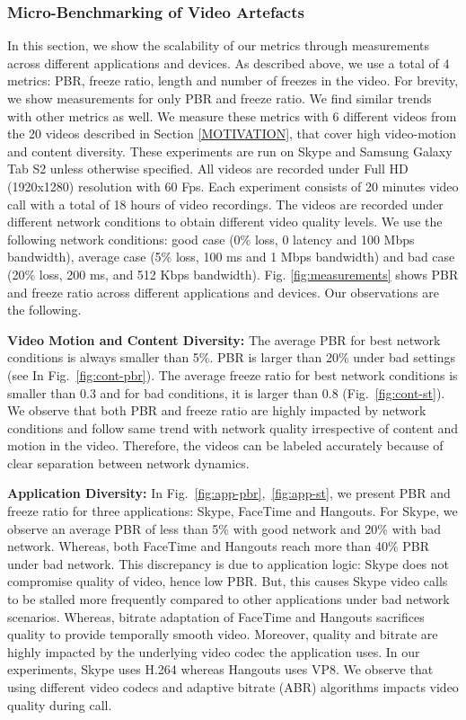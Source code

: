 \subsubsection{Micro-Benchmarking of Video Artefacts}
In this section, we show the scalability of our metrics through measurements across different applications and devices. As described above, we use a total of 4 metrics: PBR, freeze ratio, length and number of freezes in the video. For brevity, we show measurements for only PBR and freeze ratio. We find similar trends with other metrics as well. We measure these metrics with 6 different videos from the 20 videos described in Section \ref{MOTIVATION}, that cover high video-motion and content diversity. These experiments are run on Skype and Samsung Galaxy Tab S2 unless otherwise specified. All videos are recorded under Full HD (1920x1280) resolution with 60 Fps. Each experiment consists of 20 minutes video call with a total of 18 hours of video recordings. The videos are recorded under different network conditions to obtain different video quality  levels. We use the following network conditions: good case (0\% loss, 0 latency and 100 Mbps bandwidth), average case (5\% loss, 100 ms and 1 Mbps bandwidth) and bad case (20\% loss, 200 ms, and 512 Kbps bandwidth). Fig. \ref{fig:measurements} shows PBR and freeze ratio across different applications and devices. Our observations are the following.



\noindent \textbf{Video Motion and Content Diversity:} 
The average PBR for best network conditions is always smaller than 5\%. PBR is larger than 20\% under bad settings (see In Fig.~\ref{fig:cont-pbr}). 
The average freeze ratio for best network conditions is smaller than 0.3 and for bad conditions, it is larger than 0.8 (Fig.~\ref{fig:cont-st}). 
We observe that both PBR and freeze ratio are highly impacted by network conditions and follow same trend with network quality irrespective of content and motion in the video.
Therefore, the videos can be labeled accurately because of clear separation between network dynamics.

\noindent \textbf{Application Diversity:} 
In Fig.~\ref{fig:app-pbr},~\ref{fig:app-st}, we present PBR and freeze ratio for three applications: Skype, FaceTime and Hangouts.
For Skype, we observe an average PBR of less than 5\% with good network and 20\% with bad network. 
Whereas, both FaceTime and Hangouts reach more than 40\% PBR under bad network. 
This discrepancy is due to application logic: Skype does not compromise quality of video, hence low PBR. But, this causes Skype video calls to be stalled more frequently compared to other applications under bad network scenarios. Whereas,  bitrate adaptation of FaceTime and Hangouts sacrifices quality to provide temporally smooth video. 
Moreover, quality and bitrate are highly impacted by the underlying video codec the application uses. In our experiments, Skype uses H.264 whereas Hangouts uses VP8. We observe that using different video codecs and adaptive bitrate (ABR) algorithms impacts video quality during call.


